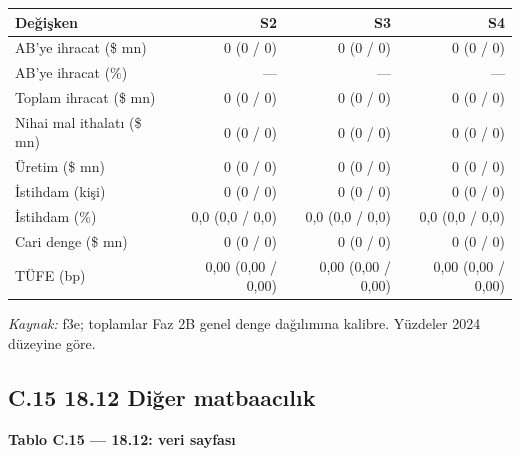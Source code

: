\begin{longtable}[]{@{}lrrr@{}}
\toprule\noalign{}
\textbf{Değişken} & \textbf{S2} & \textbf{S3} & \textbf{S4} \\
\midrule\noalign{}
\endhead
\bottomrule\noalign{}
\endlastfoot
AB'ye ihracat (\$ mn) & 0 (0 / 0) & 0 (0 / 0) & 0 (0 / 0) \\
AB'ye ihracat (\%) & --- & --- & --- \\
Toplam ihracat (\$ mn) & 0 (0 / 0) & 0 (0 / 0) & 0 (0 / 0) \\
Nihai mal ithalatı (\$ mn) & 0 (0 / 0) & 0 (0 / 0) & 0 (0 / 0) \\
Üretim (\$ mn) & 0 (0 / 0) & 0 (0 / 0) & 0 (0 / 0) \\
İstihdam (kişi) & 0 (0 / 0) & 0 (0 / 0) & 0 (0 / 0) \\
İstihdam (\%) & 0,0 (0,0 / 0,0) & 0,0 (0,0 / 0,0) & 0,0 (0,0 / 0,0) \\
Cari denge (\$ mn) & 0 (0 / 0) & 0 (0 / 0) & 0 (0 / 0) \\
TÜFE (bp) & 0,00 (0,00 / 0,00) & 0,00 (0,00 / 0,00) & 0,00 (0,00 / 0,00) \\
\end{longtable}

\endgroup

\emph{Kaynak:} \etiketT{} f3e; toplamlar Faz 2B genel denge dağılımına kalibre. Yüzdeler 2024 düzeyine göre.

\hypertarget{nace_kartlar_16-18-c15-1812-diux11fer-matbaacux131lux131k}{%
\subsection{C.15 18.12 Diğer matbaacılık}\label{nace_kartlar_16-18-c15-1812-diux11fer-matbaacux131lux131k}}


\textbf{Tablo C.15 --- 18.12: veri sayfası}

\nopagebreak[4]

\begingroup\gbtablo\small

